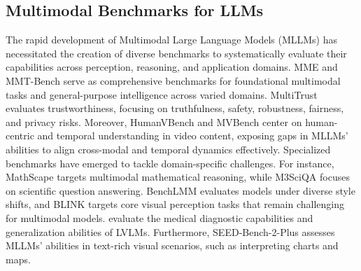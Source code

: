 \subsection{Multimodal Benchmarks for LLMs}
The rapid development of Multimodal Large Language Models (MLLMs) has necessitated the creation of diverse benchmarks to systematically evaluate their capabilities across perception, reasoning, and application domains. MME \cite{MME} and MMT-Bench \cite{MMT-Bench} serve as comprehensive benchmarks for foundational multimodal tasks and general-purpose intelligence across varied domains. MultiTrust \cite{MultiTrust} evaluates trustworthiness, focusing on truthfulness, safety, robustness, fairness, and privacy risks. Moreover, HumanVBench \cite{humanvbench} and MVBench \cite{MVBench} center on human-centric and temporal understanding in video content, exposing gaps in MLLMs' abilities to align cross-modal and temporal dynamics effectively. Specialized benchmarks have emerged to tackle domain-specific challenges. For instance, MathScape \cite{MathScape} targets multimodal mathematical reasoning, while M3SciQA \cite{M3SciQA} focuses on scientific question answering. BenchLMM \cite{BenchLMM} evaluates models under diverse style shifts, and BLINK \cite{BLINK} targets core visual perception tasks that remain challenging for multimodal models. \citet{MedLVLM} evaluate the medical diagnostic capabilities and generalization abilities of LVLMs. Furthermore, SEED-Bench-2-Plus \cite{SEED-Bench-2-Plus} assesses MLLMs' abilities in text-rich visual scenarios, such as interpreting charts and maps. 






